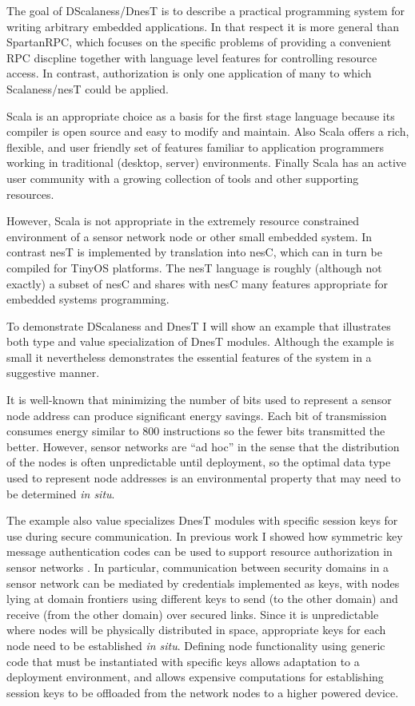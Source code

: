 The goal of DScalaness/DnesT is to describe a practical programming system for writing arbitrary
embedded applications. In that respect it is more general than SpartanRPC, which focuses on the
specific problems of providing a convenient RPC discpline together with language level features
for controlling resource access. In contrast, authorization is only one application of many to
which Scalaness/nesT could be applied.

Scala is an appropriate choice as a basis for the first stage language because its compiler is
open source and easy to modify and maintain. Also Scala offers a rich, flexible, and user
friendly set of features familiar to application programmers working in traditional (desktop,
server) environments. Finally Scala has an active user community with a growing collection of
tools and other supporting resources.

However, Scala is not appropriate in the extremely resource constrained environment of a sensor
network node or other small embedded system. In contrast nesT is implemented by translation into
nesC, which can in turn be compiled for TinyOS platforms. The nesT language is roughly (although
not exactly) a subset of nesC and shares with nesC many features appropriate for embedded
systems programming.

To demonstrate DScalaness and DnesT I will show an example that illustrates both type and value
specialization of DnesT modules. Although the example is small it nevertheless demonstrates the
essential features of the system in a suggestive manner.

It is well-known that minimizing the number of bits used to represent a sensor node address can
produce significant energy savings. Each bit of transmission consumes energy similar to 800
instructions \cite{tag} so the fewer bits transmitted the better. However, sensor networks are
``ad hoc'' in the sense that the distribution of the nodes is often unpredictable until
deployment, so the optimal data type used to represent node addresses is an environmental
property that may need to be determined \emph{in situ}.

The example also value specializes DnesT modules with specific session keys for use during
secure communication. In previous work I showed how symmetric key message authentication codes
can be used to support resource authorization in sensor networks
\cite{chapin-skalka-SpartanRPC,chapin-skalka-SpartanRPCTR}. In particular, communication between
security domains in a sensor network can be mediated by credentials implemented as keys, with
nodes lying at domain frontiers using different keys to send (to the other domain) and receive
(from the other domain) over secured links. Since it is unpredictable where nodes will be
physically distributed in space, appropriate keys for each node need to be established \emph{in
  situ}. Defining node functionality using generic code that must be instantiated with specific
keys allows adaptation to a deployment environment, and allows expensive computations for
establishing session keys to be offloaded from the network nodes to a higher powered device.

